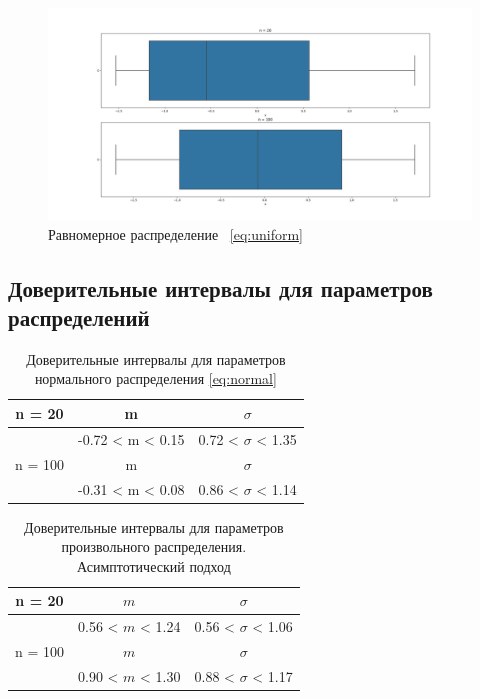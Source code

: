 \documentclass[12pt,a4paper]{article}
\begin{document}
	\begin{figure}[htbp!]
		\begin{center}
			\includegraphics[width = 1.12\linewidth]{graphics/uniform.png}
			\caption{Равномерное распределение \ \eqref{eq:uniform}}
		\end{center}
	\end{figure}

	\newpage

	\subsection{Доверительные интервалы для параметров распределений}

	\begin{table}[htbp!]
		\centering
		\begin{tabular}{ |c|c|c| }
			\hline
			n = 20 & m & $\sigma$ \\
			\hline
			& -0.72 < m < 0.15 & 0.72 < $\sigma$ < 1.35 \\
			\hline
			n = 100 & m & $\sigma$ \\
			\hline
			& -0.31 < m < 0.08 & 0.86 < $\sigma$ < 1.14 \\
			\hline
		\end{tabular}
		\caption{Доверительные интервалы для параметров нормального распределения \eqref{eq:normal}}
		\label{table:1}
	\end{table}

	\begin{table}[htbp!]
		\centering
		\begin{tabular}{ |c|c|c| }
			\hline
			n = 20 & $m$ & $\sigma$ \\
			\hline
			& 0.56 < $m$ < 1.24 & 0.56 < $\sigma$ < 1.06 \\
			\hline
			n = 100 & $m$ & $\sigma$ \\
			\hline
			& 0.90 < $m$ < 1.30 & 0.88 < $\sigma$ < 1.17 \\
			\hline
		\end{tabular}
		\caption{Доверительные интервалы для параметров произвольного распределения. Асимптотический подход}
		\label{table:2}
	\end{table}
\end{document}
